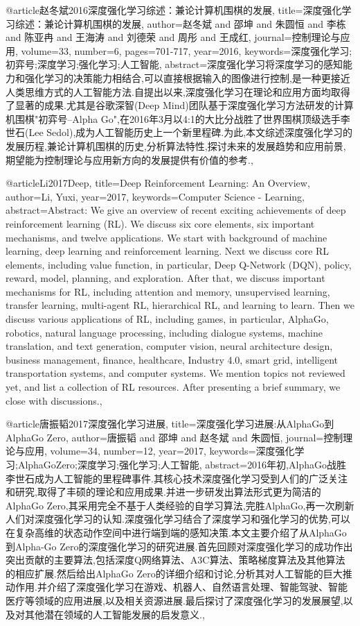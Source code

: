 @article{赵冬斌2016深度强化学习综述：兼论计算机围棋的发展,
  title={深度强化学习综述：兼论计算机围棋的发展},
  author={赵冬斌 and 邵坤 and 朱圆恒 and 李栋 and 陈亚冉 and 王海涛 and 刘德荣 and 周彤 and 王成红},
  journal={控制理论与应用},
  volume={33},
  number={6},
  pages={701-717},
  year={2016},
 keywords={深度强化学习;初弈号;深度学习;强化学习;人工智能},
 abstract={深度强化学习将深度学习的感知能力和强化学习的决策能力相结合,可以直接根据输入的图像进行控制,是一种更接近人类思维方式的人工智能方法.自提出以来,深度强化学习在理论和应用方面均取得了显著的成果.尤其是谷歌深智(Deep Mind)团队基于深度强化学习方法研发的计算机围棋"初弈号–Alpha Go",在2016年3月以4:1的大比分战胜了世界围棋顶级选手李世石(Lee Sedol),成为人工智能历史上一个新里程碑.为此,本文综述深度强化学习的发展历程,兼论计算机围棋的历史,分析算法特性,探讨未来的发展趋势和应用前景,期望能为控制理论与应用新方向的发展提供有价值的参考.},
}

@article{Li2017Deep,
  title={Deep Reinforcement Learning: An Overview},
  author={Li, Yuxi},
  year={2017},
 keywords={Computer Science - Learning},
 abstract={Abstract: We give an overview of recent exciting achievements of deep reinforcement learning (RL). We discuss six core elements, six important mechanisms, and twelve applications. We start with background of machine learning, deep learning and reinforcement learning. Next we discuss core RL elements, including value function, in particular, Deep Q-Network (DQN), policy, reward, model, planning, and exploration. After that, we discuss important mechanisms for RL, including attention and memory, unsupervised learning, transfer learning, multi-agent RL, hierarchical RL, and learning to learn. Then we discuss various applications of RL, including games, in particular, AlphaGo, robotics, natural language processing, including dialogue systems, machine translation, and text generation, computer vision, neural architecture design, business management, finance, healthcare, Industry 4.0, smart grid, intelligent transportation systems, and computer systems. We mention topics not reviewed yet, and list a collection of RL resources. After presenting a brief summary, we close with discussions.},
}

@article{唐振韬2017深度强化学习进展,
  title={深度强化学习进展:从AlphaGo到AlphaGo Zero},
  author={唐振韬 and 邵坤 and 赵冬斌 and 朱圆恒},
  journal={控制理论与应用},
  volume={34},
  number={12},
  year={2017},
 keywords={深度强化学习;AlphaGoZero;深度学习;强化学习;人工智能},
 abstract={2016年初,AlphaGo战胜李世石成为人工智能的里程碑事件.其核心技术深度强化学习受到人们的广泛关注和研究,取得了丰硕的理论和应用成果.并进一步研发出算法形式更为简洁的AlphaGo Zero,其采用完全不基于人类经验的自学习算法,完胜AlphaGo,再一次刷新人们对深度强化学习的认知.深度强化学习结合了深度学习和强化学习的优势,可以在复杂高维的状态动作空间中进行端到端的感知决策.本文主要介绍了从AlphaGo到Alpha-Go Zero的深度强化学习的研究进展.首先回顾对深度强化学习的成功作出突出贡献的主要算法,包括深度Q网络算法、A3C算法、策略梯度算法及其他算法的相应扩展.然后给出AlphaGo Zero的详细介绍和讨论,分析其对人工智能的巨大推动作用.并介绍了深度强化学习在游戏、机器人、自然语言处理、智能驾驶、智能医疗等领域的应用进展,以及相关资源进展.最后探讨了深度强化学习的发展展望,以及对其他潜在领域的人工智能发展的启发意义.},
}

